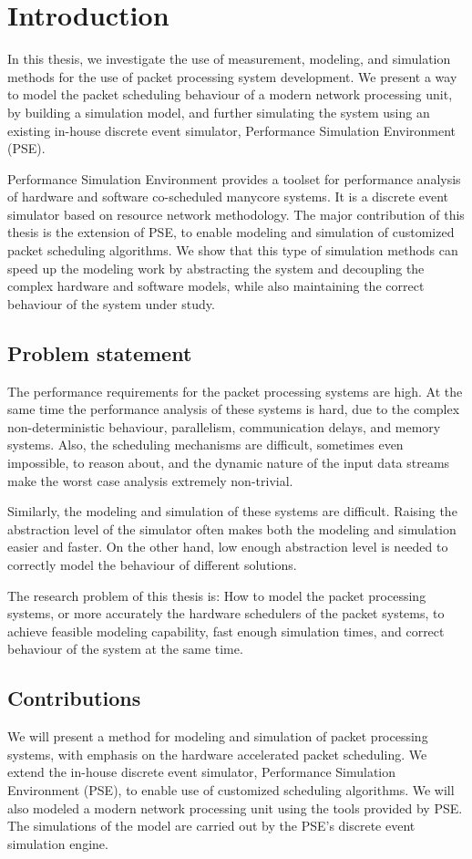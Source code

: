 \chapter{Introduction}
\label{chapter:intro}
In this thesis, we investigate the use of measurement, modeling, and simulation methods for the use of packet processing system development. We present a way to model the packet scheduling behaviour of a modern network processing unit, by building a simulation model, and further simulating the system using an existing in-house discrete event simulator, Performance Simulation Environment (PSE).

Performance Simulation Environment provides a toolset for performance analysis of hardware and software co-scheduled manycore systems. It is a discrete event simulator based on resource network methodology. The major contribution of this thesis is the extension of PSE, to enable modeling and simulation of customized packet scheduling algorithms. We show that this type of simulation methods can speed up the modeling work by abstracting the system and decoupling the complex hardware and software models, while also maintaining the correct behaviour of the system under study.

\section{Problem statement}
The performance requirements for the packet processing systems are high. At the same time the performance analysis of these systems is hard, due to the complex non-deterministic behaviour, parallelism, communication delays, and memory systems. Also, the scheduling mechanisms are difficult, sometimes even impossible, to reason about, and the dynamic nature of the input data streams make the worst case analysis extremely non-trivial.

Similarly, the modeling and simulation of these systems are difficult. Raising the abstraction level of the simulator often makes both the modeling and simulation easier and faster. On the other hand, low enough abstraction level is needed to correctly model the behaviour of different solutions.

The research problem of this thesis is: How to model the packet processing systems, or more accurately the hardware schedulers of the packet systems, to achieve feasible modeling capability, fast enough simulation times, and correct behaviour of the system at the same time.

\section{Contributions}
We will present a method for modeling and simulation of packet processing systems, with emphasis on the hardware accelerated packet scheduling. We extend the in-house discrete event simulator, Performance Simulation Environment (PSE), to enable use of customized scheduling algorithms. We will also modeled a modern network processing unit using the tools provided by PSE. The simulations of the model are carried out by the PSE's discrete event simulation engine.


